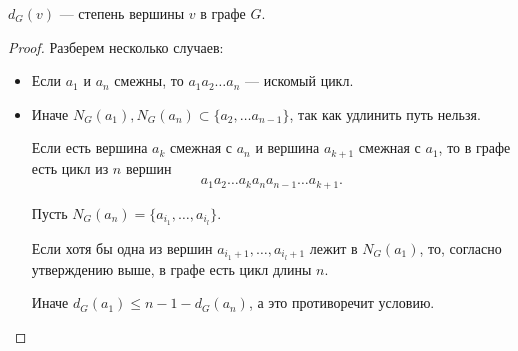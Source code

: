 $d_G(v)$ --- степень вершины  $v$ в графе $G$.

\begin{proof}
	Разберем несколько случаев:
	\begin{itemize}
		\item Если $a_1$ и $a_{n}$ смежны, то $a_1a_2\ldots a_{n}$ --- искомый цикл.
		\item Иначе $N_{G}(a_1), N_{G}(a_{n}) \subset \{a_2, \ldots a_{n-1}\}$, так как удлинить путь нельзя.

			\begin{minipage}{0.6\textwidth}
				Если есть вершина $a_{k}$ смежная с $a_{n}$ и вершина $a_{k+1}$ смежная с $a_1$, то в графе есть цикл из $n$ вершин
					\[
					a_1a_2\ldots a_{k}a_{n}a_{n-1}\ldots a_{k+1}
					.\] 
			\end{minipage}
			\hfill
			\begin{minipage}{0.25\textwidth}
				\centering
				\label{fig:lm-circle}
			\end{minipage}
			Пусть $N_G(a_{n}) = \{a_{i_1}, \ldots , a_{i_l}\}$.

			Если хотя бы одна из вершин $a_{i_{1}+1}, \ldots , a_{i_{l}+1}$ лежит в $N_{G}(a_1)$, то, согласно утверждению выше, в графе есть цикл длины $n$. 

			Иначе $d_G(a_1) \le n-1 - d_G(a_n)$, а это противоречит условию.
	\end{itemize}
\end{proof}

